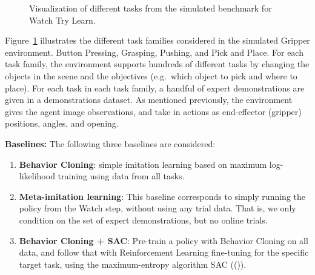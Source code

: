 \documentclass[
  letterpaper,
  numbers=noenddot,
  DIV=11,
  oneside]{scrreprt}
\theoremstyle{remark}
\begin{document}
\begin{figure}


\caption{\label{fig-envs}Visualization of different tasks from the
simulated benchmark for Watch Try Learn.}

\end{figure}%

Figure~\ref{fig-envs} illustrates the different task families considered
in the simulated Gripper environment. Button Pressing, Grasping,
Pushing, and Pick and Place. For each task family, the environment
supports hundreds of different tasks by changing the objects in the
scene and the objectives (e.g.~which object to pick and where to place).
For each task in each task family, a handful of expert demonstrations
are given in a demonstrations dataset. As mentioned previously, the
environment gives the agent image observations, and take in actions as
end-effector (gripper) positions, angles, and opening.

\textbf{Baselines:} The following three baselines are considered:

\begin{enumerate}
\def\labelenumi{\arabic{enumi}.}
\item
  \textbf{Behavior Cloning}: simple imitation learning based on maximum
  log-likelihood training using data from all tasks.
\item
  \textbf{Meta-imitation learning}: This baseline corresponds to simply
  running the policy from the Watch step, without using any trial data.
  That is, we only condition on the set of expert demonstrations, but no
  online trials.
\item
  \textbf{Behavior Cloning + SAC}: Pre-train a policy with Behavior
  Cloning on all data, and follow that with Reinforcement Learning
  fine-tuning for the specific target task, using the maximum-entropy
  algorithm SAC (()).
\end{enumerate}
\end{document}

